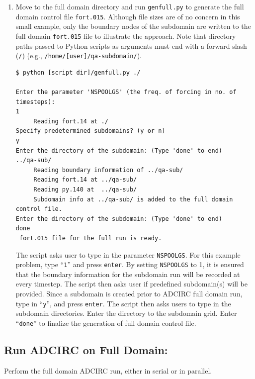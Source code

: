 \documentclass[11pt,titlepage]{article}
\begin{document}
\begin{enumerate}
\item Move to the full domain directory and run \verb+genfull.py+ to
  generate the full domain control file \verb+fort.015+. Although file
  sizes are of no concern in this small example, only the boundary
  nodes of the subdomain are written to the full domain
  \verb+fort.015+ file to illustrate the approach. Note that directory
  paths passed to Python scripts as arguments must end with a forward
  slash (\texttt{/}) (e.g., \verb+/home/[user]/qa-subdomain/+).

\begin{verbatim}
$ python [script dir]/genfull.py ./

Enter the parameter 'NSPOOLGS' (the freq. of forcing in no. of timesteps): 
1
	 Reading fort.14 at ./
Specify predetermined subdomains? (y or n) 
y
Enter the directory of the subdomain: (Type 'done' to end)
../qa-sub/
	 Reading boundary information of ../qa-sub/
	 Reading fort.14 at ../qa-sub/
	 Reading py.140 at  ../qa-sub/
	 Subdomain info at ../qa-sub/ is added to the full domain control file.
Enter the directory of the subdomain: (Type 'done' to end)
done
 fort.015 file for the full run is ready.
\end{verbatim}

 The script asks user to type in the parameter \texttt{NSPOOLGS}. For this example problem, type ``\texttt{1}'' and press \texttt{enter}. By setting \texttt{NSPOOLGS} to 1, it is ensured that the boundary information for the subdomain run will be recorded at every timestep. The script then asks user if predefined subdomain(s) will be provided. Since a subdomain is created prior to ADCIRC full domain run, type in ``\texttt{y}'', and press \texttt{enter}. The script then asks users to type in the subdomain directories. Enter the directory to the subdomain grid. Enter ``\texttt{done}'' to finalize the generation of full domain control file.


\end{enumerate}


\subsection*{Run ADCIRC on Full Domain: }

Perform the full domain ADCIRC run, either in serial or in parallel.
\end{document}
